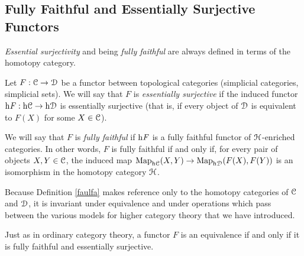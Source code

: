 \subsection{Fully Faithful and Essentially Surjective Functors}
\begin{1.2.10 F. faithful; E. surj functors}
\begin{definition}\label{faulfa}
\begin{shaded}
\emph{Essential surjectivity} and being \emph{fully faithful} are always defined in terms of the homotopy category.
\end{shaded}
Let $F: \operatorname{\mathcal{C}} \rightarrow \operatorname{\mathcal{D}}$ be a functor between topological categories (simplicial categories, simplicial sets). We will say that $F$ is {\it essentially surjective} if the induced functor 
$\rm{h} \it{F}: \rm{h} \it{\operatorname{\mathcal{C}}} \rightarrow \rm{h} \it{\operatorname{\mathcal{D}}}$ is essentially surjective (that is, if every object of $\operatorname{\mathcal{D}}$ is
equivalent to $F(X)$ for some $X \in \operatorname{\mathcal{C}}$). 

We will say that $F$ is {\it fully faithful} if $\rm{h} \it{F}$ is a fully faithful functor of $\operatorname{\mathcal{H}}$-enriched categories. In other words, $F$ is fully faithful if and only if, for every pair of objects
$X, Y \in \operatorname{\mathcal{C}}$, the induced map
$\operatorname{{Map}}_{\rm{h} \it{\operatorname{\mathcal{C}}}}(X,Y) \rightarrow \operatorname{{Map}}_{\rm{h} \it{\operatorname{\mathcal{D}}}}(F(X),F(Y))$ is an isomorphism in the homotopy category $\operatorname{\mathcal{H}}$. 
\end{definition}

\begin{remark}
Because Definition \ref{faulfa} makes reference only to the homotopy categories of $\operatorname{\mathcal{C}}$ and $\operatorname{\mathcal{D}}$, it is invariant under equivalence and under operations which pass between
the various models for higher category theory that we have introduced.
\end{remark}

Just as in ordinary category theory, a functor $F$ is an equivalence if and only if it is fully faithful and essentially surjective.
\end{1.2.10 F. faithful; E. surj functors}
